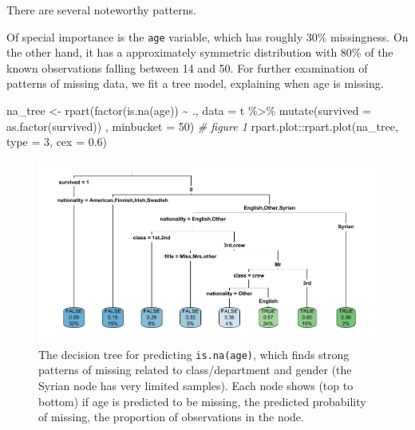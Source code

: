 \documentclass[]{interact}
\theoremstyle{plain}%
\theoremstyle{definition}
\theoremstyle{remark}
\newenvironment{Shaded}{\begin{snugshade}}{\end{snugshade}}
\newcommand{\AttributeTok}[1]{\textcolor[rgb]{0.77,0.63,0.00}{#1}}
\newcommand{\CommentTok}[1]{\textcolor[rgb]{0.56,0.35,0.01}{\textit{#1}}}
\newcommand{\DecValTok}[1]{\textcolor[rgb]{0.00,0.00,0.81}{#1}}
\newcommand{\FloatTok}[1]{\textcolor[rgb]{0.00,0.00,0.81}{#1}}
\newcommand{\FunctionTok}[1]{\textcolor[rgb]{0.00,0.00,0.00}{#1}}
\newcommand{\NormalTok}[1]{#1}
\newcommand{\OtherTok}[1]{\textcolor[rgb]{0.56,0.35,0.01}{#1}}
\newcommand{\SpecialCharTok}[1]{\textcolor[rgb]{0.00,0.00,0.00}{#1}}
\begin{document}
There are several noteworthy patterns.

Of special importance is the \texttt{age} variable, which has roughly 30\% missingness. On the other hand, it has a approximately symmetric distribution with 80\% of the known observations falling between 14 and 50. For further examination of patterns of missing data, we fit a tree model, explaining when age is missing.

\begin{Shaded}
\begin{Highlighting}[]
\NormalTok{na\_tree }\OtherTok{\textless{}{-}} \FunctionTok{rpart}\NormalTok{(}\FunctionTok{factor}\NormalTok{(}\FunctionTok{is.na}\NormalTok{(age)) }\SpecialCharTok{\textasciitilde{}}\NormalTok{ ., }
                 \AttributeTok{data =}\NormalTok{ t }\SpecialCharTok{\%\textgreater{}\%} \FunctionTok{mutate}\NormalTok{(}\AttributeTok{survived =} \FunctionTok{as.factor}\NormalTok{(survived)) , }
                 \AttributeTok{minbucket =} \DecValTok{50}\NormalTok{)}
\CommentTok{\# figure 1}
\NormalTok{rpart.plot}\SpecialCharTok{::}\FunctionTok{rpart.plot}\NormalTok{(na\_tree, }\AttributeTok{type =} \DecValTok{3}\NormalTok{, }\AttributeTok{cex =} \FloatTok{0.6}\NormalTok{)}
\end{Highlighting}
\end{Shaded}

\begin{figure}

{\centering \includegraphics{titanic-survival_files/figure-latex/na-tree-1} 

}

\caption{The decision tree for predicting \texttt{is.na(age)}, which finds strong patterns of missing related to class/department and gender (the Syrian node has very limited samples). Each node shows (top to bottom) if age is predicted to be missing, the predicted probability of missing, the proportion of observations in the node.}\label{fig:na-tree}
\end{figure}
\end{document}
